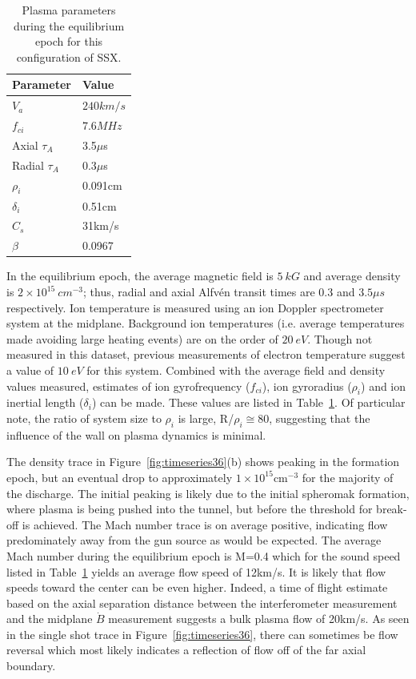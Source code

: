 \documentclass[12pt]{iopart}
\begin{document}
\begin{table}
\caption{\label{tab:params}Plasma parameters during the equilibrium epoch for this configuration of SSX.}
\begin{tabular}{ll}
Parameter&Value\\
\hline
$V_{a}$&$240km/s$\\
$f_{ci}$&$7.6MHz$\\
Axial $\tau_{A}$&3.5$\mu$s\\
Radial $\tau_{A}$&0.3$\mu$s\\
$\rho_{i}$&0.091cm\\
$\delta_{i}$&0.51cm\\
$C_{s}$&31km/s\\
$\beta$&0.0967\\
\end{tabular}
\end{table}

In the equilibrium epoch, the average magnetic field is $5~kG$ and average density is $2\times 10^{15}~cm^{-3}$; thus, radial and axial Alfv\'en transit times are 0.3 and $3.5\mu s$ respectively. Ion temperature is measured using an ion Doppler spectrometer system at the midplane. Background ion temperatures (i.e. average temperatures made avoiding large heating events) are on the order of $20~eV$. Though not measured in this dataset, previous measurements of electron temperature suggest a value of $10~eV$ for this system. Combined with the average field and density values measured, estimates of ion gyrofrequency ($f_{ci}$), ion gyroradius ($\rho_{i}$) and ion inertial length ($\delta_{i}$) can be made. These values are listed in Table~\ref{tab:params}. Of particular note, the ratio of system size to $\rho_{i}$ is large, R/$\rho_{i} \cong 80$, suggesting that the influence of the wall on plasma dynamics is minimal.

The density trace in Figure~\ref{fig:timeseries36}(b) shows peaking in the formation epoch, but an eventual drop to approximately $1\times 10^{15}$cm$^{-3}$ for the majority of the discharge. The initial peaking is likely due to the initial spheromak formation, where plasma is being pushed into the tunnel, but before the threshold for break-off is achieved. The Mach number trace is on average positive, indicating flow predominately away from the gun source as would be expected. The average Mach number during the equilibrium epoch is M=0.4 which for the sound speed listed in Table~\ref{tab:params} yields an average flow speed of 12km/s. It is likely that flow speeds toward the center can be even higher. Indeed, a time of flight estimate based on the axial separation distance between the interferometer measurement and the midplane $\dot{B}$ measurement suggests a bulk plasma flow of 20km/s. As seen in the single shot trace in Figure~\ref{fig:timeseries36}, there can sometimes be flow reversal which most likely indicates a reflection of flow off of the far axial boundary.
\end{document}
